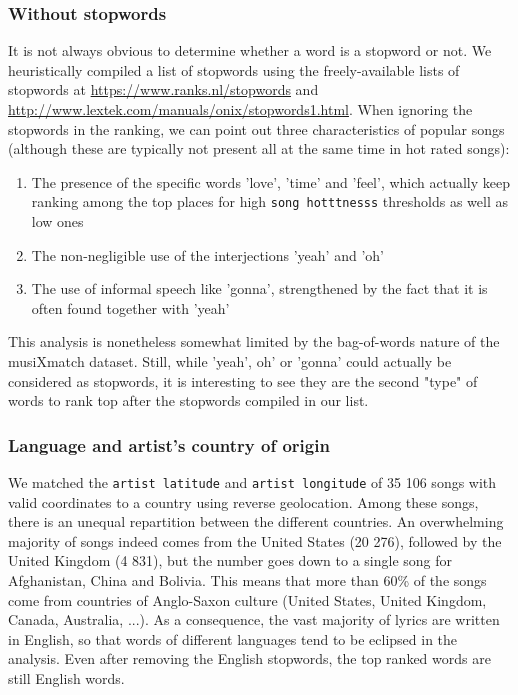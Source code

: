 \documentclass[11pt]{article}
\renewcommand\_{\textunderscore\allowbreak}
\begin{document}
\subsubsection{Without stopwords}
It is not always obvious to determine whether a word is a stopword or not. We heuristically compiled a list of stopwords using the freely-available lists of stopwords at \url{https://www.ranks.nl/stopwords} and \url{http://www.lextek.com/manuals/onix/stopwords1.html}.
When ignoring the stopwords in the ranking, we can point out three characteristics of popular songs (although these are typically not present all at the same time in hot rated songs):
\begin{enumerate}
\itemsep 0mm
\item The presence of the specific words 'love', 'time' and 'feel', which actually keep ranking among the top places for high \texttt{song hotttnesss} thresholds as well as low ones
\item The non-negligible use of the interjections 'yeah' and 'oh' 
\item The use of informal speech like 'gonna', strengthened by the fact that it is often found together with 'yeah'
\end{enumerate}
This analysis is nonetheless somewhat limited by the bag-of-words nature of the musiXmatch dataset. Still, while 'yeah', oh' or 'gonna' could actually be considered as stopwords, it is interesting to see they are the second "type" of words to rank top after the stopwords compiled in our list.


\subsubsection{Language and artist's country of origin}
We matched the \texttt{artist latitude} and \texttt{artist longitude} of 35 106 songs with valid coordinates to a country using reverse geolocation.  %
Among these songs, there is an unequal repartition between the different countries.
An overwhelming majority of songs indeed comes from the United States (20 276), followed by the United Kingdom (4 831), but the number goes down to a single song for Afghanistan, China and Bolivia.
This means that more than 60\% of the songs come from countries of Anglo-Saxon culture (United States, United Kingdom, Canada, Australia, ...). As a consequence, the vast majority of lyrics are written in English, so that words of different languages tend to be eclipsed in the analysis.
Even after removing the English stopwords, the top ranked words are still English words.
\end{document}
